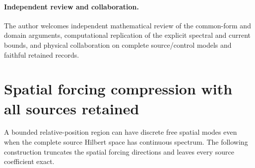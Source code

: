 \documentclass[11pt]{article}
\numberwithin{equation}{section}
\theoremstyle{definition}
\theoremstyle{remark}
\begin{document}
\paragraph{Independent review and collaboration.}
The author welcomes independent mathematical review of the common-form
and domain arguments, computational replication of the explicit
spectral and current bounds, and physical collaboration on complete
source/control models and faithful retained records.

\appendix
\section{Spatial forcing compression with all sources retained}
\label{p4s:sec:spatial}

A bounded relative-position region can have discrete free spatial
modes even when the complete source Hilbert space has continuous
spectrum. The following construction truncates the spatial forcing
directions and leaves every source coefficient exact.
\end{document}
